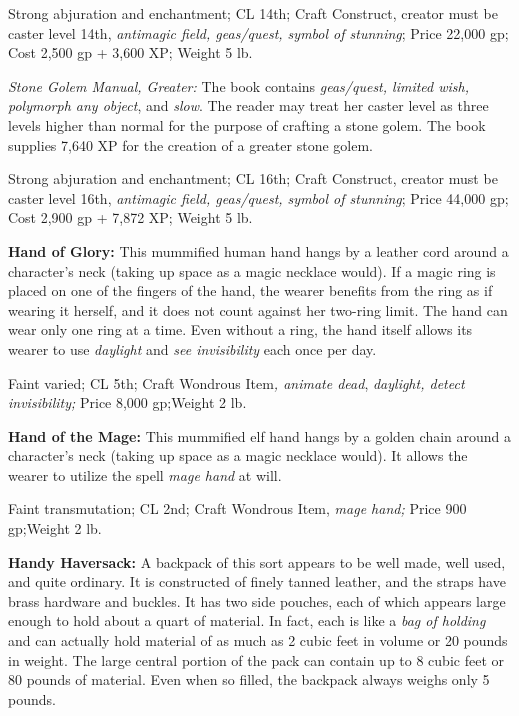 Strong abjuration and enchantment; CL 14th; Craft Construct, creator must be caster 
level 14th, \textit{antimagic field, geas/quest, symbol of stunning}; Price 22,000 
gp; Cost 2,500 gp + 3,600 XP; Weight 5 lb.

\textit{Stone Golem Manual, Greater: }The book contains \textit{geas/quest, limited 
wish, polymorph any object}, and \textit{slow}. The reader may treat her caster 
level as three levels higher than normal for the purpose of crafting a stone golem. 
The book supplies 7,640 XP for the creation of a greater stone golem.

Strong abjuration and enchantment; CL 16th; Craft Construct, creator must be caster 
level 16th, \textit{antimagic field, geas/quest, symbol of stunning}; Price 44,000 
gp; Cost 2,900 gp + 7,872 XP; Weight 5 lb.

\textbf{Hand of Glory:} This mummified human hand hangs by a leather cord around 
a character's neck (taking up space as a magic necklace would). If a magic ring 
is placed on one of the fingers of the hand, the wearer benefits from the ring 
as if wearing it herself, and it does not count against her two-ring limit. The 
hand can wear only one ring at a time. Even without a ring, the hand itself allows 
its wearer to use \textit{daylight }and \textit{see invisibility }each once per 
day.

Faint varied; CL 5th; Craft Wondrous Item\textit{, animate dead}, \textit{daylight, 
detect invisibility; }Price 8,000 gp;Weight 2 lb.

\textbf{Hand of the Mage:} This mummified elf hand hangs by a golden chain around 
a character's neck (taking up space as a magic necklace would). It allows the wearer 
to utilize the spell \textit{mage hand }at will.

Faint transmutation; CL 2nd; Craft Wondrous Item, \textit{mage hand; }Price 900 
gp;Weight 2 lb.

\textbf{Handy Haversack:} A backpack of this sort appears to be well made, well 
used, and quite ordinary. It is constructed of finely tanned leather, and the straps 
have brass hardware and buckles. It has two side pouches, each of which appears 
large enough to hold about a quart of material. In fact, each is like a \textit{bag 
of holding }and can actually hold material of as much as 2 cubic feet in volume 
or 20 pounds in weight. The large central portion of the pack can contain up to 
8 cubic feet or 80 pounds of material. Even when so filled, the backpack always 
weighs only 5 pounds.

